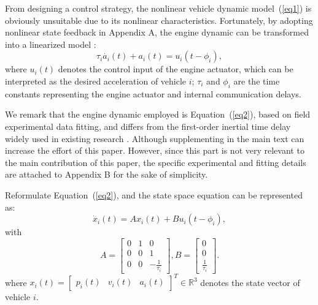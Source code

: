 \documentclass[a4paper]{cas-sc}
\begin{document}
From designing a control strategy, the nonlinear vehicle dynamic model~(\ref{eq1}) is obviously unsuitable due to its nonlinear characteristics. Fortunately, by adopting nonlinear state feedback in Appendix A, the engine dynamic can be transformed into a linearized model \citep{Wang2018e}:
\begin{equation}
  \tau_i\dot{a_i}\left(t\right)+a_i\left(t\right)=u_i(t-\phi_i),
  \label{eq2}
\end{equation}
where $u_i(t)$ denotes the control input of the engine actuator, which can be interpreted as the desired acceleration of vehicle $i$; $\tau_i$ and $\phi_i$ are the time constants representing the engine actuator and internal communication delays.

We remark that the engine dynamic employed is Equation~(\ref{eq2}), based on field experimental data fitting, and differs from the first-order inertial time delay widely used in existing research \citep{Wang2018e,Coskun2021,Zhang2021,Ma2021}. Although supplementing in the main text can increase the effort of this paper. However, since this part is not very relevant to the main contribution of this paper, the specific experimental and fitting details are attached to Appendix B for the sake of simplicity.

Reformulate Equation~(\ref{eq2}), and the state space equation can be represented as:
\begin{equation}
  {\dot x_i}\left( t \right) = A{x_i}\left( t \right) + B{u_i}\left( {t - {\phi _i}} \right),
  \label{eq3}
\end{equation}
with
\begin{equation}
  A = \left[ {\begin{array}{*{20}{c}}
          0 & 1 & 0                          \\
          0 & 0 & 1                          \\
          0 & 0 & { - \frac{1}{{{\tau _i}}}}
        \end{array}} \right],B = \left[ {\begin{array}{*{20}{c}}
          0 \\
          0 \\
          {\frac{1}{{{\tau _i}}}}
        \end{array}} \right].
  \label{eq4}
\end{equation}
where ${x_i}\left( t \right) = {\left[ {\begin{array}{*{20}{c}}
          {{p_i}\left( t \right)} & {{v_i}\left( t \right)} & {{a_i}\left( t \right)}
        \end{array}} \right]^T} \in {\mathbb{R}^3}$ denotes the state vector of vehicle $i$.
\end{document}
